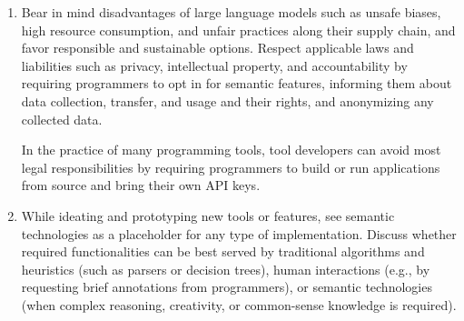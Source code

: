 \begin{enumerate}
	\item {}
	Bear in mind disadvantages of large language models such as unsafe biases, high resource consumption, and unfair practices along their supply chain, and favor responsible and sustainable options.
	Respect applicable laws and liabilities such as privacy, intellectual property, and accountability by requiring programmers to opt in for semantic features, informing them about data collection, transfer, and usage and their rights, and anonymizing any collected data.

	In the practice of many programming tools, tool developers can avoid most legal responsibilities by requiring programmers to build or run applications from source and bring their own API keys.

	\item {}
	While ideating and prototyping new tools or features, see semantic technologies as a placeholder for any type of implementation.
	Discuss whether required functionalities can be best served by traditional algorithms and heuristics (such as parsers or decision trees), human interactions (e.g., by requesting brief annotations from programmers), or semantic technologies (when complex reasoning, creativity, or common-sense knowledge is required).
\end{enumerate}
